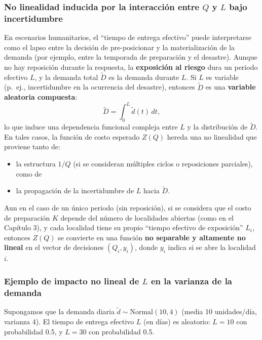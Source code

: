 \documentclass[
  spanish,
  us-letterpaper,
]{scrreprt}
\providecommand{\tightlist}{%
  \setlength{\itemsep}{0pt}\setlength{\parskip}{0pt}}
\numberwithin{equation}{section}
\begin{document}
\subsubsection{\texorpdfstring{No linealidad inducida por la interacción
entre \(Q\) y \(L\) bajo
incertidumbre}{No linealidad inducida por la interacción entre Q y L bajo incertidumbre}}\label{no-linealidad-inducida-por-la-interacciuxf3n-entre-q-y-l-bajo-incertidumbre}

En escenarios humanitarios, el ``tiempo de entrega efectivo'' puede
interpretarse como el lapso entre la decisión de pre-posicionar y la
materialización de la demanda (por ejemplo, entre la temporada de
preparación y el desastre). Aunque no hay reposición durante la
respuesta, la \textbf{exposición al riesgo} dura un periodo efectivo
\(L\), y la demanda total \(\tilde{D}\) es la demanda durante \(L\). Si
\(L\) es variable (p.~ej., incertidumbre en la ocurrencia del desastre),
entonces \(\tilde{D}\) es una \textbf{variable aleatoria compuesta}: \[
\tilde{D} = \int_0^L \tilde{d}(t) \, dt,
\] lo que induce una dependencia funcional compleja entre \(L\) y la
distribución de \(\tilde{D}\). En tales casos, la función de costo
esperado \(Z(Q)\) hereda una no linealidad que proviene tanto de:

\begin{itemize}
\tightlist
\item
  la estructura \(1/Q\) (si se consideran múltiples ciclos o
  reposiciones parciales), como de
\item
  la propagación de la incertidumbre de \(L\) hacia \(\tilde{D}\).
\end{itemize}

Aun en el caso de un único periodo (sin reposición), si se considera que
el costo de preparación \(K\) depende del número de localidades abiertas
(como en el Capítulo 3), y cada localidad tiene su propio ``tiempo
efectivo de exposición'' \(L_i\), entonces \(Z(Q)\) se convierte en una
función \textbf{no separable y altamente no lineal} en el vector de
decisiones \((Q_i, y_i)\), donde \(y_i\) indica si se abre la localidad
\(i\).

\subsubsection{\texorpdfstring{Ejemplo de impacto no lineal de \(L\) en
la varianza de la
demanda}{Ejemplo de impacto no lineal de L en la varianza de la demanda}}\label{sec-impacto}

Supongamos que la demanda diaria \(\tilde{d} \sim \text{Normal}(10, 4)\)
(media 10 unidades/día, varianza 4). El tiempo de entrega efectivo \(L\)
(en días) es aleatorio: \(L = 10\) con probabilidad 0.5, y \(L = 30\)
con probabilidad 0.5.
\end{document}
